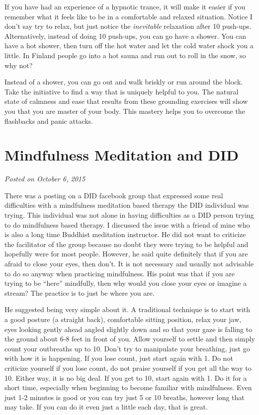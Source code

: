 \documentclass[]{book}
\begin{document}
If you have had an experience of a hypnotic trance, it will make it easier if you remember what it feels like to be in a comfortable and relaxed situation. Notice I don't say try to relax, but just notice the \emph{inevitable} relaxation after 10 push-ups.
Alternatively, instead of doing 10 push-ups, you can go have a shower. You can have a hot shower, then turn off the hot water and let the cold water shock you a little. In Finland people go into a hot sauna and run out to roll in the snow, so why not?

Instead of a shower, you can go out and walk briskly or run around the block. Take the initiative to find a way that is uniquely helpful to you. The natural state of calmness and ease that results from these grounding exercises will show you that you are master of your body. This mastery helps you to overcome the flashbacks and panic attacks.

\hypertarget{mindfulness-meditation-and-did}{%
\section{Mindfulness Meditation and DID}\label{mindfulness-meditation-and-did}}

\emph{Posted on October 6, 2015}

There was a posting on a DID facebook group that expressed some real difficulties with a mindfulness meditation based therapy the DID individual was trying. This individual was not alone in having difficulties as a DID person trying to do mindfulness based therapy. I discussed the issue with a friend of mine who is also a long time Buddhist meditation instructor. He did not want to criticize the facilitator of the group because no doubt they were trying to be helpful and hopefully were for most people. However, he said quite definitely that if you are afraid to close your eyes, then don't. It is not necessary and usually not advisable to do so anyway when practicing mindfulness. His point was that if you are trying to be ``here'' mindfully, then why would you close your eyes or imagine a stream? The practice is to just be where you are.

He suggested being very simple about it. A traditional technique is to start with a good posture (a straight back), comfortable sitting position, relax your jaw, eyes looking gently ahead angled slightly down and so that your gaze is falling to the ground about 6-8 feet in front of you. Allow yourself to settle and then simply count your outbreaths up to 10. Don't try to manipulate your breathing, just go with how it is happening. If you lose count, just start again with 1. Do not criticize yourself if you lose count, do not praise yourself if you get all the way to 10. Either way, it is no big deal. If you get to 10, start again with 1. Do it for a short time, especially when beginning to become familiar with mindfulness. Even just 1-2 minutes is good or you can try just 5 or 10 breaths, however long that may take. If you can do it even just a little each day, that is great.
\end{document}
